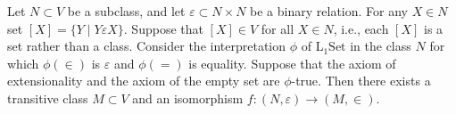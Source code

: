 Let $N \subset V$ be a subclass, and let $\varepsilon \subset N \times N$ be a binary relation. For any $X \in N$ set $[X] = \{Y \mid Y \varepsilon X\}$. Suppose that $[X] \in V$ for all $X \in N$, i.e., each $[X]$ is a set rather than a class. Consider the interpretation $\phi$ of $\mathrm{L}_1\mathrm{Set}$ in the class $N$ for which $\phi(\in)$ is $\varepsilon$ and $\phi(=)$ is equality. Suppose that the axiom of extensionality and the axiom of the empty set are $\phi$-true. Then there exists a transitive class $M \subset V$ and an isomorphism $f: (N, \varepsilon) \to (M, \in)$.
